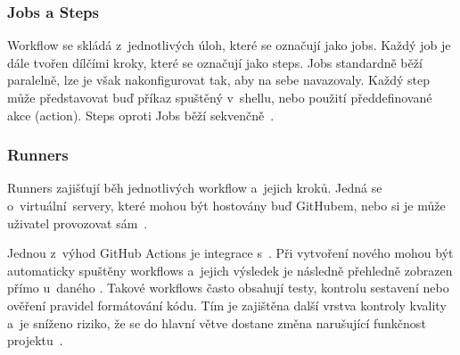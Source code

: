 \subsubsection*{Jobs a Steps}
\label{subsubsec:github:actions_jobs_steps}
Workflow se skládá z~jednotlivých úloh, které se označují jako jobs. Každý job je dále tvořen dílčími kroky, které se označují jako steps. Jobs standardně běží paralelně, lze je však nakonfigurovat tak, aby na sebe navazovaly. Každý step může představovat buď příkaz spuštěný v~shellu, nebo použití předdefinované akce (action). Steps oproti Jobs běží sekvenčně~\cite{github_actions_docs}.

\subsubsection*{Runners}
\label{subsubsec:github:actions_runners}
Runners zajišťují běh jednotlivých workflow a~jejich kroků. Jedná se o~virtuální~servery, které mohou být hostovány buď GitHubem, nebo si je může uživatel provozovat sám~\cite{github_actions_docs}.

Jednou z~výhod GitHub Actions je integrace s~\PR. Při vytvoření nového \PR mohou být automaticky spuštěny workflows a~jejich výsledek je následně přehledně zobrazen přímo u~daného \PR. Takové workflows často obsahují testy, kontrolu sestavení nebo ověření pravidel formátování kódu. Tím je zajištěna další vrstva kontroly kvality a~je sníženo riziko, že se do hlavní větve dostane změna narušující funkčnost projektu~\cite{github_actions_docs,github_pull_requests_docs}.